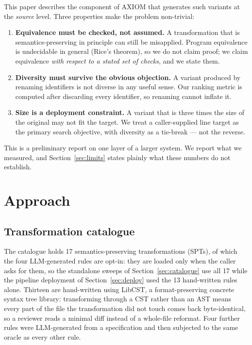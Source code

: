 \documentclass[10pt,twocolumn]{article}
\begin{document}
This paper describes the component of AXIOM that generates such variants at the
\emph{source} level. Three properties make the problem non-trivial:

\begin{enumerate}
\item \textbf{Equivalence must be checked, not assumed.} A transformation that
      is semantics-preserving in principle can still be misapplied. Program
      equivalence is undecidable in general (Rice's theorem), so we do not claim
      proof; we claim equivalence \emph{with respect to a stated set of checks},
      and we state them.
\item \textbf{Diversity must survive the obvious objection.} A variant produced
      by renaming identifiers is not diverse in any useful sense. Our ranking
      metric is computed after discarding every identifier, so renaming cannot
      inflate it.
\item \textbf{Size is a deployment constraint.} A variant that is three times
      the size of the original may not fit the target. We treat a caller-supplied
      line target as the primary search objective, with diversity as a
      tie-break --- not the reverse.
\end{enumerate}

This is a preliminary report on one layer of a larger system. We report what we
measured, and Section~\ref{sec:limits} states plainly what these numbers do not
establish.

\section{Approach}

\subsection{Transformation catalogue}

The catalogue holds 17 semantics-preserving transformations (SPTs), of which the
four LLM-generated rules are opt-in: they are loaded only when the caller asks
for them, so the standalone sweeps of Section~\ref{sec:catalogue} use all 17
while the pipeline deployment of Section~\ref{sec:deploy} used the 13
hand-written rules alone. Thirteen are
hand-written using LibCST, a format-preserving concrete syntax tree library:
transforming through a CST rather than an AST means every part of the file the
transformation did not touch comes back byte-identical, so a reviewer reads a
minimal diff instead of a whole-file reformat. Four further rules were
LLM-generated from a specification and then subjected to the same oracle as
every other rule.
\end{document}
